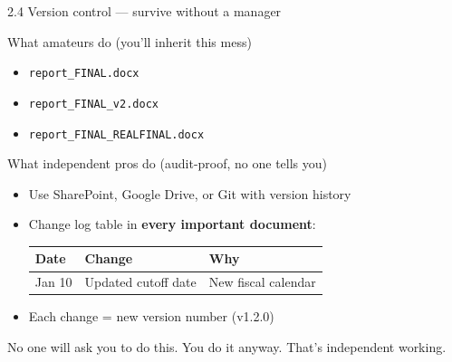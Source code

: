 \documentclass[aspectratio=169, 11pt]{beamer}
\begin{document}
	\begin{frame}{2.4 Version control — survive without a manager}
		\begin{block}{What amateurs do (you'll inherit this mess)}
			\begin{itemize}
				\item \texttt{report\_FINAL.docx}
				\item \texttt{report\_FINAL\_v2.docx}
				\item \texttt{report\_FINAL\_REALFINAL.docx}
			\end{itemize}
		\end{block}
		\vspace{0.1cm}
		\begin{block}{What independent pros do (audit-proof, no one tells you)}
			\begin{itemize}
				\item Use SharePoint, Google Drive, or Git with version history
				\item Change log table in \textbf{every important document}:
				\small{\begin{tabular}{lll}
						\toprule
						\textbf{Date} & \textbf{Change} & \textbf{Why} \\
						\midrule
						Jan 10 & Updated cutoff date & New fiscal calendar \\
						\bottomrule
				\end{tabular}}
				\item Each change = new version number (v1.2.0)
			\end{itemize}
		\end{block}
		\alert{No one will ask you to do this. You do it anyway. That's independent working.}
	\end{frame}
	
\end{document}
